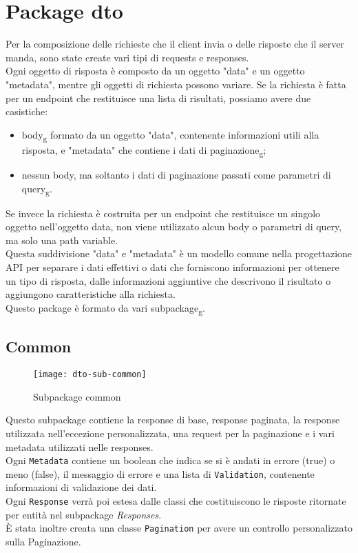 \section{Package dto}
Per la composizione delle richieste che il client invia o delle risposte che il server manda, sono state create vari tipi di requests e responses.\\
Ogni oggetto di risposta è composto da un oggetto "data" e un oggetto "metadata", mentre gli oggetti di richiesta possono variare. Se la richiesta è fatta per un endpoint che restituisce una lista di risultati, possiamo avere due casistiche:
\begin{itemize}
\item body\textsubscript{g} formato da un oggetto "data", contenente informazioni utili alla risposta, e "metadata" che contiene i dati di paginazione\textsubscript{g};
\item nessun body, ma soltanto i dati di paginazione passati come parametri di query\textsubscript{g}.
\end{itemize}
Se invece la richiesta è costruita per un endpoint che restituisce un singolo oggetto nell'oggetto data, non viene utilizzato alcun body o parametri di query, ma solo una path variable.\\
Questa suddivisione "data" e "metadata" è un modello comune nella progettazione API per separare i dati effettivi o dati che forniscono informazioni per ottenere un tipo di risposta, dalle informazioni aggiuntive che descrivono il risultato o aggiungono caratteristiche alla richiesta.\\
Questo package è formato da vari subpackage\textsubscript{g}.
\subsection{Common}
\begin{figure}[H] 
    \centering 
    \texttt{[image: dto-sub-common]} 
    \caption{Subpackage common}
\end{figure}
Questo subpackage contiene la response di base, response paginata, la response utilizzata nell'eccezione personalizzata, una request per la paginazione e i vari metadata utilizzati nelle responses.\\ Ogni \texttt{Metadata} contiene un boolean che indica se si è andati in errore (true) o meno (false), il messaggio di errore e una lista di \texttt{Validation}, contenente informazioni di validazione dei dati.\\
Ogni \texttt{Response} verrà poi estesa dalle classi che costituiscono le risposte ritornate per entità nel subpackage \textit{Responses}.\\
È stata inoltre creata una classe \texttt{Pagination} per avere un controllo personalizzato sulla Paginazione.
